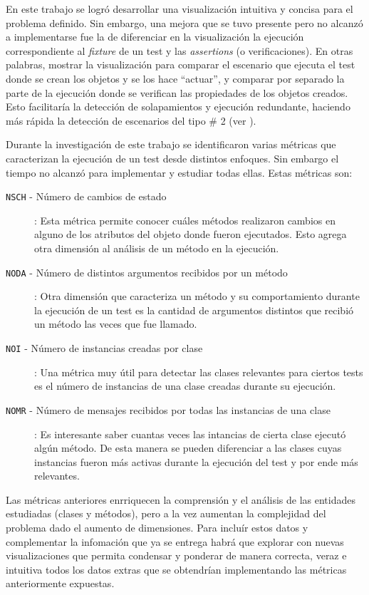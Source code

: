 \par En este trabajo se logró desarrollar una visualización intuitiva y concisa para el problema definido. Sin embargo, una mejora que se tuvo presente pero no alcanzó a implementarse fue la de diferenciar en la visualización la ejecución correspondiente al \emph{fixture} de un test y las \emph{assertions} (o verificaciones). En otras palabras, mostrar la visualización para comparar el escenario que ejecuta el test donde se crean los objetos y se los hace ``actuar'', y comparar por separado la parte de la ejecución donde se verifican las propiedades de los objetos creados. Esto facilitaría la detección de solapamientos y ejecución redundante, haciendo más rápida la detección de escenarios del tipo \# 2 (ver ).

\par Durante la investigación de este trabajo se identificaron varias métricas que caracterizan la ejecución de un test desde distintos enfoques. Sin embargo el tiempo no alcanzó para implementar y estudiar todas ellas. Estas métricas son:

\begin{description}
\item[{\tt NSCH} - Número de cambios de estado]: Esta métrica permite conocer cuáles métodos realizaron cambios en alguno de los atributos del objeto donde fueron ejecutados. Esto agrega otra dimensión al análisis de un método en la ejecución.
\item[{\tt NODA} - Número de distintos argumentos recibidos por un método]: Otra dimensión que caracteriza un método y su comportamiento durante la ejecución de un test es la cantidad de argumentos distintos que recibió un método las veces que fue llamado.
\item[{\tt NOI} - Número de instancias creadas por clase]: Una métrica muy útil para detectar las clases relevantes para ciertos tests es el número de instancias de una clase creadas durante su ejecución. 
\item[{\tt NOMR} - Número de mensajes recibidos por todas las instancias de una clase]: Es interesante saber cuantas veces las intancias de cierta clase ejecutó algún método. De esta manera se pueden diferenciar a las clases cuyas instancias fueron más activas durante la ejecución del test y por ende más relevantes.

\end{description}

\par Las métricas anteriores enrriquecen la comprensión y el análisis de las entidades estudiadas (clases y métodos), pero a la vez aumentan la complejidad del problema dado el aumento de dimensiones. Para incluír estos datos y complementar la infomación que ya se entrega habrá que explorar con nuevas visualizaciones que permita condensar y ponderar de manera correcta, veraz e intuitiva todos los datos extras que se obtendrían implementando las métricas anteriormente expuestas.


